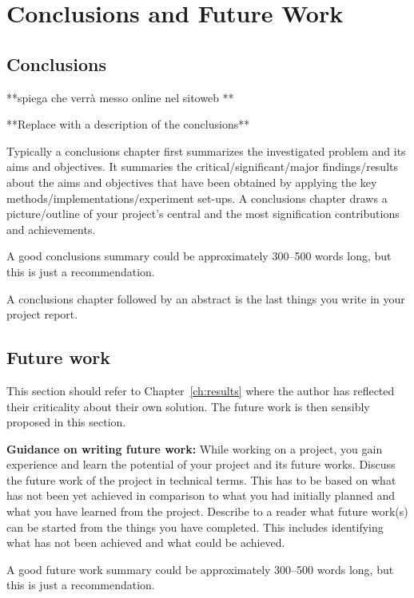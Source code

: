 \chapter{Conclusions and Future Work}
\label{ch:con}
\section{Conclusions}

**spiega che verrà messo online nel sitoweb **

**Replace with a description of the conclusions**


Typically a conclusions chapter first summarizes the investigated problem and its aims and objectives. It summaries the critical/significant/major findings/results about the aims and objectives that have been obtained by applying the key methods/implementations/experiment set-ups. A conclusions chapter draws a picture/outline of your project's central and the most signification contributions and achievements. 

A good conclusions summary could be approximately 300--500 words long, but this is just a recommendation.

A conclusions chapter followed by an abstract is the last things you write in your project report.

\section{Future work}
This section should refer to Chapter~\ref{ch:results} where the author has reflected their criticality about their own solution. The future work is then sensibly proposed in this section.

\textbf{Guidance on writing future work:} While working on a project, you gain experience and learn the potential of your project and its future works. Discuss the future work of the project in technical terms. This has to be based on what has not been yet achieved in comparison to what you had initially planned and what you have learned from the project. Describe to a reader what future work(s) can be started from the things you have completed. This includes identifying what has not been achieved and what could be achieved. 



A good future work summary could be approximately 300--500 words long, but this is just a recommendation.